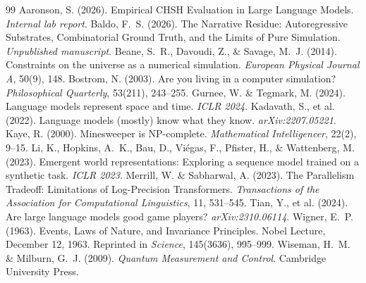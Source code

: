 \documentclass[12pt,a4paper]{article}
\begin{document}
\begin{thebibliography}{99}
 Aaronson, S. (2026). Empirical CHSH Evaluation in Large Language Models. \emph{Internal lab report}.
 Baldo, F.~S. (2026). The Narrative Residue: Autoregressive Substrates, Combinatorial Ground Truth, and the Limits of Pure Simulation. \emph{Unpublished manuscript}.
 Beane, S.~R., Davoudi, Z., \& Savage, M.~J. (2014). Constraints on the universe as a numerical simulation. \emph{European Physical Journal A}, 50(9), 148.
 Bostrom, N. (2003). Are you living in a computer simulation? \emph{Philosophical Quarterly}, 53(211), 243--255.
 Gurnee, W. \& Tegmark, M. (2024). Language models represent space and time. \emph{ICLR 2024}.
 Kadavath, S., et al. (2022). Language models (mostly) know what they know. \emph{arXiv:2207.05221}.
 Kaye, R. (2000). Minesweeper is NP-complete. \emph{Mathematical Intelligencer}, 22(2), 9--15.
 Li, K., Hopkins, A.~K., Bau, D., Vi\'egas, F., Pfister, H., \& Wattenberg, M. (2023). Emergent world representations: Exploring a sequence model trained on a synthetic task. \emph{ICLR 2023}.
 Merrill, W. \& Sabharwal, A. (2023). The Parallelism Tradeoff: Limitations of Log-Precision Transformers. \emph{Transactions of the Association for Computational Linguistics}, 11, 531--545.
 Tian, Y., et al. (2024). Are large language models good game players? \emph{arXiv:2310.06114}.
 Wigner, E.~P. (1963). Events, Laws of Nature, and Invariance Principles. Nobel Lecture, December 12, 1963. Reprinted in \emph{Science}, 145(3636), 995--999.
 Wiseman, H.~M. \& Milburn, G.~J. (2009). \emph{Quantum Measurement and Control}. Cambridge University Press.
\end{thebibliography}
\end{document}
